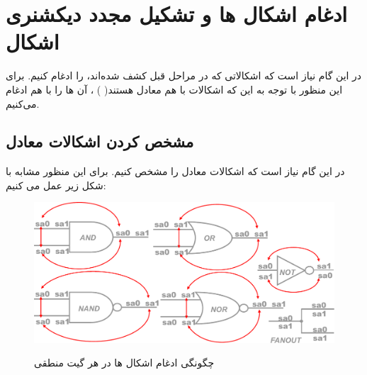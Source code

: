 \section{ادغام اشکال ها و تشکیل مجدد دیکشنری اشکال}
در این گام نیاز است که اشکالاتی که در مراحل قبل کشف شده‌اند، را ادغام کنیم. برای این منظور با توجه به این که اشکالات با هم معادل هستند(
)
، آن ها را با هم ادغام می‌کنیم.
\subsection{مشخص کردن اشکالات معادل}
در این گام نیاز است که اشکالات معادل را مشخص کنیم. برای این منظور مشابه با شکل زیر عمل می کنیم:
\\
\begin{figure}[H]
	\centering
	\includegraphics[scale=0.5]{fault_collapsing/images/fault_collapsing.pdf}
	\label{FaultCollapsing}
	\caption{چگونگی ادغام اشکال ها در هر گیت منطقی}
\end{figure}

